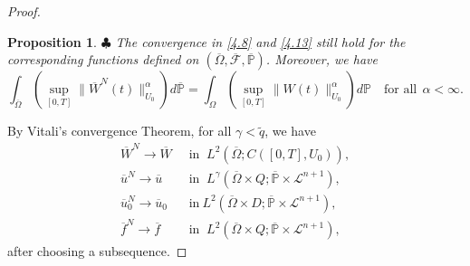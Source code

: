 \documentclass[reqno]{amsart}
\newtheorem{Proposition}{Proposition}[section]
\theoremstyle{definition}
\theoremstyle{remark}
\numberwithin{equation}{section} \allowdisplaybreaks
\begin{document}
\begin{proof}
\begin{Proposition}
$\clubsuit$ The convergence in \eqref{4.8} and \eqref{4.13} still
hold for the corresponding functions defined on
$(\overline{\Omega},\overline{\mathscr{F}},\overline{\mathbb{P}})$.
Moreover, we have
$$\int_{\overline{\Omega}}\left(\sup_{[0,T]}\|\overline{W}^N(t)\|^{\alpha}_{{U}_0}\right)
d\overline{\mathbb{P}}=\int_{\Omega}\left(\sup_{[0,T]}\|W(t)\|^{\alpha}_{{U}_0}\right)d\mathbb{P}\quad
\text{for all}\ \ \alpha<\infty.$$
\end{Proposition}



 By Vitali's convergence Theorem,
for all $\gamma<\tilde{q}$, we have
\begin{align}\label{4.20}
\overline{W}^N\rightarrow \overline{W}& ~\mbox{ in }~
L^2(\overline{\Omega};C([0,T],{U}_0)),\\
\label{4.21} \overline{u}^N\rightarrow \overline{u}& ~\mbox{ in }~
L^\gamma(\overline{\Omega}\times
Q;\overline{\mathbb{P}}\times\mathcal{L}^{n+1}), \\
\label{4.22} \overline{u}_0^N\rightarrow \overline{u}_0& ~\mbox{ in
}~ L^2(\overline{\Omega}\times
D;\overline{\mathbb{P}}\times\mathcal{L}^{n+1}), \\
\label{4.23} \overline{f}^N\rightarrow \overline{f}& ~\mbox{ in }~
L^2(\overline{\Omega}\times
Q;\overline{\mathbb{P}}\times\mathcal{L}^{n+1}),
\end{align}
after choosing a subsequence.


\end{proof}
\end{document}
